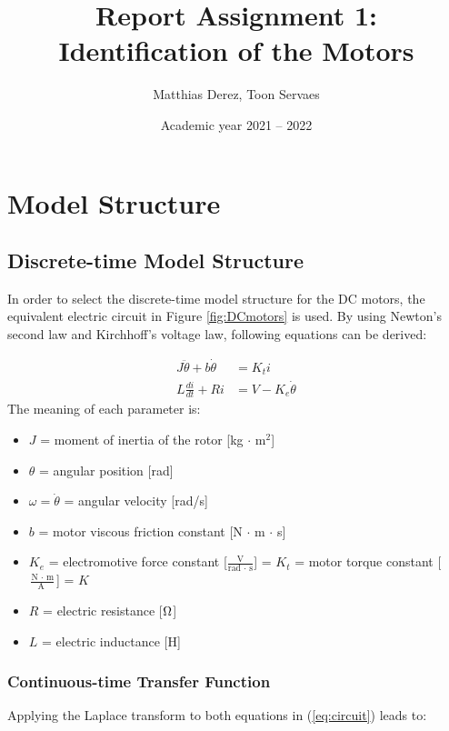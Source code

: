 \documentclass[a4paper,kul]{kulakarticle} %
\date{Academic year 2021 -- 2022}
\title{Report Assignment 1: Identification of the Motors}
\author{Matthias Derez, Toon Servaes}
\begin{document}
\maketitle

\section{Model Structure}
\subsection{Discrete-time Model Structure} 
\label{subsec:complex_model}
In order to select the discrete-time model structure for the DC motors, the equivalent electric circuit in Figure \ref{fig:DCmotors} is used. By using Newton's second law and Kirchhoff's voltage law, following equations can be derived:

\begin{equation}
    \label{eq:circuit}
    \begin{split}
         J\ddot{\theta}  + b\dot{\theta} &= K_{t}i \\
         L\frac{di}{dt} + Ri &= V - K_{e}\dot{\theta}
     \end{split} 
\end{equation}
The meaning of each parameter is:
\begin{itemize}
    \item $J$ = moment of inertia of the rotor [kg $\cdot$ m$^2$]
    \item $\theta$ = angular position [rad]
    \item $\omega = \dot{\theta}$ = angular velocity [rad/s]
    \item $b$ = motor viscous friction constant [N $\cdot$ m $\cdot$ s]
    \item $K_{e}$ = electromotive force constant [$\frac{\text{V}}{\text{rad } \cdot \text{ s}}$] = $K_{t}$ = motor torque constant [$\frac{\text{N } \cdot \text{ m}}{\text{A }}$] = $K$
    \item $R$ = electric resistance [$\ohm$]
    \item $L$ = electric inductance [H]
\end{itemize}

\subsubsection*{Continuous-time Transfer Function}
Applying the Laplace transform to both equations in (\ref{eq:circuit}) leads to:
\end{document}
